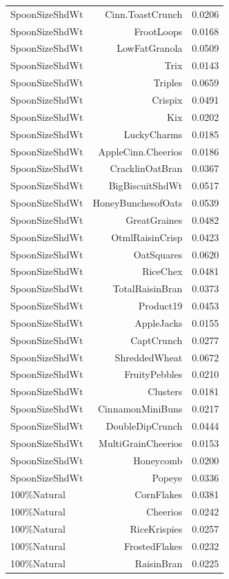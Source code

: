 \begin{longtable}{@{}lrr@{}}
SpoonSizeShdWt & Cinn.ToastCrunch & 0.0206 \\
SpoonSizeShdWt & FrootLoops & 0.0168 \\
SpoonSizeShdWt & LowFatGranola & 0.0509 \\
SpoonSizeShdWt & Trix & 0.0143 \\
SpoonSizeShdWt & Triples & 0.0659 \\
SpoonSizeShdWt & Crispix & 0.0491 \\
SpoonSizeShdWt & Kix & 0.0202 \\
SpoonSizeShdWt & LuckyCharms & 0.0185 \\
SpoonSizeShdWt & AppleCinn.Cheerios & 0.0186 \\
SpoonSizeShdWt & CracklinOatBran & 0.0367 \\
SpoonSizeShdWt & BigBiscuitShdWt & 0.0517 \\
SpoonSizeShdWt & HoneyBunchesofOats & 0.0539 \\
SpoonSizeShdWt & GreatGraines & 0.0482 \\
SpoonSizeShdWt & OtmlRaisinCrisp & 0.0423 \\
SpoonSizeShdWt & OatSquares & 0.0620 \\
SpoonSizeShdWt & RiceChex & 0.0481 \\
SpoonSizeShdWt & TotalRaisinBran & 0.0373 \\
SpoonSizeShdWt & Product19 & 0.0453 \\
SpoonSizeShdWt & AppleJacks & 0.0155 \\
SpoonSizeShdWt & CaptCrunch & 0.0277 \\
SpoonSizeShdWt & ShreddedWheat & 0.0672 \\
SpoonSizeShdWt & FruityPebbles & 0.0210 \\
SpoonSizeShdWt & Clusters & 0.0181 \\
SpoonSizeShdWt & CinnamonMiniBuns & 0.0217 \\
SpoonSizeShdWt & DoubleDipCrunch & 0.0444 \\
SpoonSizeShdWt & MultiGrainCheerios & 0.0153 \\
SpoonSizeShdWt & Honeycomb & 0.0200 \\
SpoonSizeShdWt & Popeye & 0.0336 \\
100\%Natural & CornFlakes & 0.0381 \\
100\%Natural & Cheerios & 0.0242 \\
100\%Natural & RiceKrispies & 0.0257 \\
100\%Natural & FrostedFlakes & 0.0232 \\
100\%Natural & RaisinBran & 0.0225 \\

\end{longtable}
